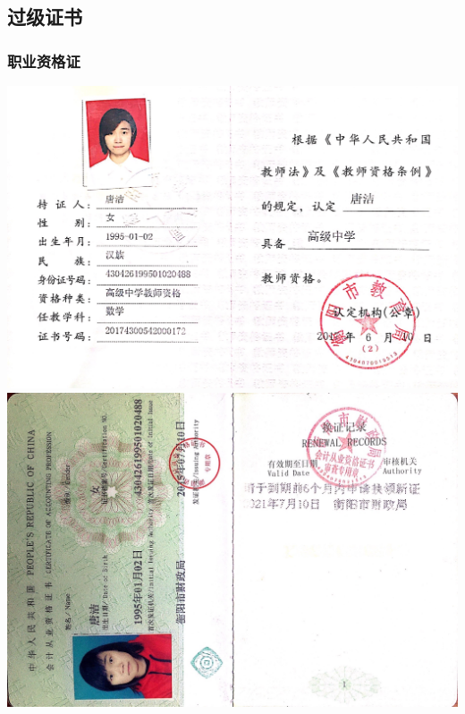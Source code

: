 \documentclass[UFT8]{ctexart}%
\begin{document}



\subsection{过级证书}
\subsubsection{职业资格证}
\begin{center}
\includegraphics[scale=0.20]{figs/教师资格证.png }
\includegraphics[scale=0.2]{figs/2015-07.png }
\end{center}
\end{document}
